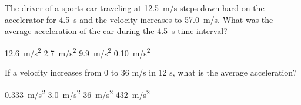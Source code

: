 \documentclass[addpoints]{exam}
\begin{document}
\begin{questions}








\question %
The driver of a sports car traveling at \SI{12.5}{m/s} steps down hard on the accelerator for \SI{4.5}{s} and the velocity increases to \SI{57.0}{m/s}. What was the average acceleration of the car during the \SI{4.5}{s} time interval?

\begin{choices}
\choice \SI{12.6}{m/s^2}
\choice \SI{2.7}{m/s^2}
\CorrectChoice \SI{9.9}{m/s^2}
\choice \SI{0.10}{m/s^2}
\end{choices}

\question %
If a velocity increases from 0 to 36 m/s in 12 s, what is the average acceleration?

\begin{choices}
\choice \SI{0.333}{m/s^2}
\CorrectChoice \SI{3.0}{m/s^2}
\choice \SI{36}{m/s^2}
\choice \SI{432}{m/s^2}
\end{choices}





\end{questions}
\end{document}
